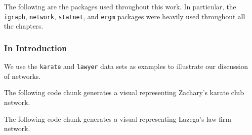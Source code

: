 \documentclass[12pt,twoside]{amherstthesis}
\begin{document}
  The following are the packages used throughout this work. In particular,
  the \texttt{igraph}, \texttt{network}, \texttt{statnet}, and
  \texttt{ergm} packages were heavily used throughout all the chapters.
  
  \begin{Shaded}
  \begin{Highlighting}[]
  
  \NormalTok{(} \NormalTok{)}
  \NormalTok{(} \NormalTok{)}
  \end{Highlighting}
  \end{Shaded}
  
  \subsubsection{In Introduction}\label{in-introduction}
  
  We use the \texttt{karate} and \texttt{lawyer} data sets as examples to
  illustrate our discussion of networks.
  
  \begin{Shaded}
  \begin{Highlighting}[]
  \end{Highlighting}
  \end{Shaded}
  
  The following code chunk generates a visual representing Zachary's
  karate club network.
  
  \begin{Shaded}
  \begin{Highlighting}[]
  \end{Highlighting}
  \end{Shaded}
  
  The following code chunk generates a visual representing Lazega's law
  firm network.
  
\end{document}
